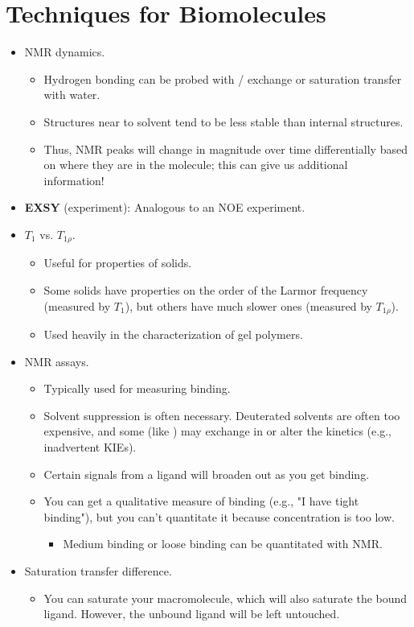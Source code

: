 \documentclass[../notes.tex]{subfiles}
\begin{document}
\section{Techniques for Biomolecules}
\begin{itemize}
    \item {}NMR dynamics.
    \begin{itemize}
        \item Hydrogen bonding can be probed with / exchange or saturation transfer with water.
        \item Structures near to solvent tend to be less stable than internal structures.
        \item Thus, NMR peaks will change in magnitude over time differentially based on where they are in the molecule; this can give us additional information!
    \end{itemize}
    \item \textbf{EXSY} (experiment): Analogous to an NOE experiment.
    \item $T_1$ vs. $T_{1\rho}$.
    \begin{itemize}
        \item Useful for properties of solids.
        \item Some solids have properties on the order of the Larmor frequency (measured by $T_1$), but others have much slower ones (measured by $T_{1\rho}$).
        \item Used heavily in the characterization of gel polymers.
    \end{itemize}
    \item NMR assays.
    \begin{itemize}
        \item Typically used for measuring binding.
        \item Solvent suppression is often necessary. Deuterated solvents are often too expensive, and some (like ) may exchange in or alter the kinetics (e.g., inadvertent KIEs).
        \item Certain signals from a ligand will broaden out as you get binding.
        \item You can get a qualitative measure of binding (e.g., "I have tight binding"), but you can't quantitate it because concentration is too low.
        \begin{itemize}
            \item Medium binding or loose binding can be quantitated with NMR.
        \end{itemize}
    \end{itemize}
    \item Saturation transfer difference.
    \begin{itemize}
        \item You can saturate your macromolecule, which will also saturate the bound ligand. However, the unbound ligand will be left untouched.
    \end{itemize}
\end{itemize}
\end{document}
